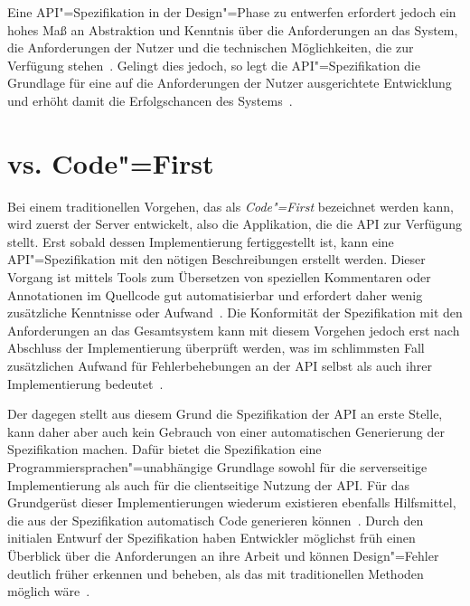 Eine \ac{API}"=Spezifikation in der Design"=Phase zu entwerfen erfordert jedoch ein hohes Maß an Abstraktion und Kenntnis über die Anforderungen an das System, die Anforderungen der Nutzer und die technischen Möglichkeiten, die zur Verfügung stehen~\cite[362]{de23}.
Gelingt dies jedoch, so legt die \ac{API}"=Spezifikation die Grundlage für eine auf die Anforderungen der Nutzer ausgerichtete Entwicklung und erhöht damit die Erfolgschancen des Systems~\cite[1627]{cha21}.

\section{\AF vs. Code"=First}
Bei einem traditionellen Vorgehen, das als \emph{Code"=First} bezeichnet werden kann, wird zuerst der Server entwickelt, also die Applikation, die die \ac{API} zur Verfügung stellt.
Erst sobald dessen Implementierung fertiggestellt ist, kann eine \ac{API}"=Spezifikation mit den nötigen Beschreibungen erstellt werden.
Dieser Vorgang ist mittels Tools zum Übersetzen von speziellen Kommentaren oder Annotationen im Quellcode gut automatisierbar und erfordert daher wenig zusätzliche Kenntnisse oder Aufwand~\cite{ope24}.
Die Konformität der Spezifikation mit den Anforderungen an das Gesamtsystem kann mit diesem Vorgehen jedoch erst nach Abschluss der Implementierung überprüft werden, was im schlimmsten Fall zusätzlichen Aufwand für Fehlerbehebungen an der \ac{API} selbst als auch ihrer Implementierung bedeutet~\cite{vol22}.

Der \AFA dagegen stellt \ua aus diesem Grund die Spezifikation der \ac{API} an erste Stelle, kann daher aber auch kein Gebrauch von einer automatischen Generierung der Spezifikation machen.
Dafür bietet die Spezifikation eine Programmiersprachen"=unabhängige Grundlage sowohl für die serverseitige Implementierung als auch für die clientseitige Nutzung der \ac{API}.
Für das Grundgerüst dieser Implementierungen wiederum existieren ebenfalls Hilfsmittel, die aus der Spezifikation automatisch Code generieren können~\cite{ope24}.
Durch den initialen Entwurf der Spezifikation haben Entwickler möglichst früh einen Überblick über die Anforderungen an ihre Arbeit und können Design"=Fehler deutlich früher erkennen und beheben, als das mit traditionellen Methoden möglich wäre~\cite[1627]{cha21}.

